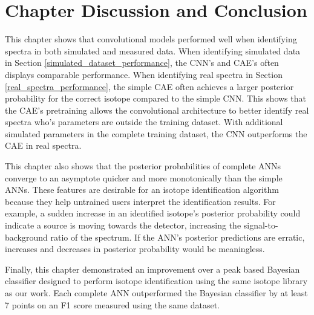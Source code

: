 \section{Chapter Discussion and Conclusion}

This chapter shows that convolutional models performed well when identifying spectra in both simulated and measured data. When identifying simulated data in Section \ref{simulated_dataset_performance}, the CNN's and CAE's often displays comparable performance. When identifying real spectra in Section \ref{real_spectra_performance}, the simple CAE often achieves a larger posterior probability for the correct isotope compared to the simple CNN. This shows that the CAE's pretraining allows the convolutional architecture to better identify real spectra who's parameters are outside the training dataset. With additional simulated parameters in the complete training dataset, the CNN outperforms the CAE in real spectra.


This chapter also shows that the posterior probabilities of complete ANNs converge to an asymptote quicker and more monotonically than the simple ANNs. These features are desirable for an isotope identification algorithm because they help untrained users interpret the identification results. For example, a sudden increase in an identified isotope's posterior probability could indicate a source is moving towards the detector, increasing the signal-to-background ratio of the spectrum. If the ANN's posterior predictions are erratic, increases and decreases in posterior probability would be meaningless.

Finally, this chapter demonstrated an improvement over a peak based Bayesian classifier designed to perform isotope identification using the same isotope library as our work. Each complete ANN outperformed the Bayesian classifier by at least 7 points on an F1 score measured using the same dataset.



